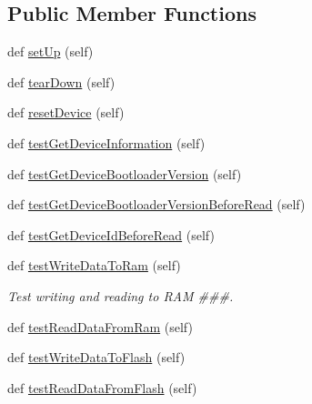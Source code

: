 \subsection*{Public Member Functions}
\begin{DoxyCompactItemize}
\item 
def \hyperlink{classstm__tools_1_1tests_1_1stmdevice__test_1_1STMInterfaceTestCase_a26b1b5aaa859d024cb7114cc1d4c1fd2}{set\+Up} (self)
\item 
def \hyperlink{classstm__tools_1_1tests_1_1stmdevice__test_1_1STMInterfaceTestCase_a56c54e463c817da67a20bb5e7b3b433a}{tear\+Down} (self)
\item 
def \hyperlink{classstm__tools_1_1tests_1_1stmdevice__test_1_1STMInterfaceTestCase_a3c64ad4ffc70313fb320cbff348ca340}{reset\+Device} (self)
\item 
def \hyperlink{classstm__tools_1_1tests_1_1stmdevice__test_1_1STMInterfaceTestCase_a408546ad5706980a509ac7d4226ba788}{test\+Get\+Device\+Information} (self)
\item 
def \hyperlink{classstm__tools_1_1tests_1_1stmdevice__test_1_1STMInterfaceTestCase_adda90c9c5669430e397f90131dc266b8}{test\+Get\+Device\+Bootloader\+Version} (self)
\item 
def \hyperlink{classstm__tools_1_1tests_1_1stmdevice__test_1_1STMInterfaceTestCase_a2df5f9e6a3f10a0160b330a5555b0f21}{test\+Get\+Device\+Bootloader\+Version\+Before\+Read} (self)
\item 
def \hyperlink{classstm__tools_1_1tests_1_1stmdevice__test_1_1STMInterfaceTestCase_a605c545bac14cf3b02c66ccbd9376603}{test\+Get\+Device\+Id\+Before\+Read} (self)
\item 
def \hyperlink{classstm__tools_1_1tests_1_1stmdevice__test_1_1STMInterfaceTestCase_a517f69dd76d9495fea814b05a467e25f}{test\+Write\+Data\+To\+Ram} (self)
\begin{DoxyCompactList}\small\item\em Test writing and reading to R\+AM \#\#\#. \end{DoxyCompactList}\item 
def \hyperlink{classstm__tools_1_1tests_1_1stmdevice__test_1_1STMInterfaceTestCase_a39b83e18c29c4fadb52969c6a26d9df2}{test\+Read\+Data\+From\+Ram} (self)
\item 
def \hyperlink{classstm__tools_1_1tests_1_1stmdevice__test_1_1STMInterfaceTestCase_a367136f856eff34bbd98d109c116b532}{test\+Write\+Data\+To\+Flash} (self)
\item 
def \hyperlink{classstm__tools_1_1tests_1_1stmdevice__test_1_1STMInterfaceTestCase_ad24b5e238a3322160c33e350ca7a4bd0}{test\+Read\+Data\+From\+Flash} (self)

\end{DoxyCompactItemize}
